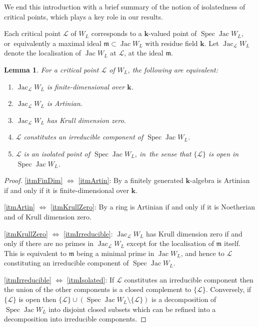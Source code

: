 \documentclass[JEP,XML,SOM,Unicode,NoEqCountersInSection,NoFloatCountersInSection,published]{cedram}
\newtheorem{lemma}[theorem]{Lemma}
\theoremstyle{definition}
\newcommand{\calL}{\mathcal{L}}
\newcommand{\kk}{{\boldsymbol{k}}}
\newcommand{\m}{\mathfrak{m}}
\newcommand{\Spec}{\operatorname{Spec}}
\newcommand{\Jac}{\operatorname{Jac}}
\begin{document}
We end this introduction with a brief summary of the notion of isolatedness of critical points, which plays a key role in our results.

Each critical point $\calL$ of $W_L$ corresponds to a $\kk$-valued point of $\Spec \Jac W_L$, or~equivalently a maximal ideal $\m \subset \Jac W_L$ with residue field $\kk$. Let $\Jac_\calL W_L$ denote the localisation of $\Jac W_L$ at $\calL$, \ie at the ideal $\m$.

\begin{lemma}
\label{lemIsolatedTFAE}
For a critical point $\calL$ of $W_L$, the following are equivalent:
\begin{enumerate}
\item\label{itmFinDim} $\Jac_\calL W_L$ is finite-dimensional over $\kk$.
\item\label{itmArtin} $\Jac_\calL W_L$ is Artinian.
\item\label{itmKrullZero} $\Jac_\calL W_L$ has Krull dimension zero.
\item\label{itmIrreducible} $\calL$ constitutes an irreducible component of $\Spec \Jac W_L$.
\item\label{itmIsolated} $\calL$ is an isolated point of $\Spec \Jac W_L$, in~the sense that $\{\calL\}$ is open in $\Spec \Jac W_L$.
\end{enumerate}
\end{lemma}
\begin{proof}
\eqref{itmFinDim} $\Leftrightarrow$ \eqref{itmArtin}: By \cite[Exer.\,8.3]{AtiyahMacdonald} a finitely generated $\kk$-algebra is Artinian if and only if it is finite-dimensional over $\kk$.

\eqref{itmArtin} $\Leftrightarrow$ \eqref{itmKrullZero}: By \cite[Th.\,8.5]{AtiyahMacdonald} a ring is Artinian if and only if it is Noetherian and of Krull dimension zero.

\eqref{itmKrullZero} $\Leftrightarrow$ \eqref{itmIrreducible}: $\Jac_\calL W_L$ has Krull dimension zero if and only if there are no primes in $\Jac_\calL W_L$ except for the localisation of $\m$ itself. This is equivalent to $\m$ being a minimal prime in $\Jac W_L$, and hence to $\calL$ constituting an irreducible component of $\Spec \Jac W_L$.

\eqref{itmIrreducible} $\Leftrightarrow$ \eqref{itmIsolated}: If $\calL$ constitutes an irreducible component then the union of the other components is a closed complement to $\{\calL\}$. Conversely, if~$\{\calL\}$ is open then $\{\calL\} \cup (\Spec \Jac W_L \setminus \{\calL\})$ is a decomposition of $\Spec \Jac W_L$ into disjoint closed subsets which can be refined into a decomposition into irreducible components.
\end{proof}
\end{document}
